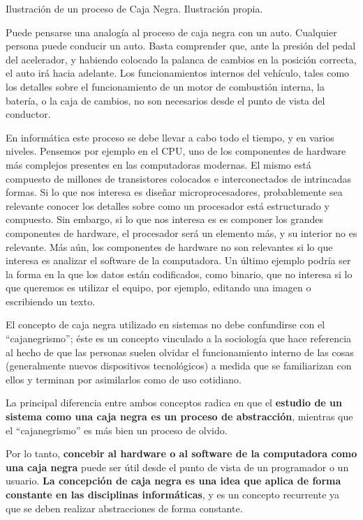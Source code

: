 {Ilustración de un proceso de Caja Negra.}
{Ilustración propia.}

Puede pensarse una analogía al proceso de caja negra con un auto. Cualquier
persona puede conducir un auto. Basta comprender que, ante la presión del
pedal del acelerador, y habiendo colocado la palanca de cambios en la posición
correcta, el auto irá hacia adelante. Los funcionamientos internos del vehículo,
tales como los detalles sobre el funcionamiento de un motor de combustión
interna, la batería, o la caja de cambios, no son necesarios desde el punto de
vista del conductor.

En informática este proceso se debe llevar a cabo todo el tiempo, y en varios niveles.
Pensemos por ejemplo en el CPU, uno de los componentes de hardware más
complejos presentes en las computadoras modernas. El mismo está compuesto
de millones de transistores colocados e interconectados de intrincadas formas.
Si lo que nos interesa es diseñar microprocesadores, probablemente sea relevante
conocer los detalles sobre como un procesador está estructurado y compuesto. Sin
embargo, si lo que nos interesa es es componer los grandes componentes de hardware,
el procesador será un elemento más, y su interior no es relevante. Más aún, los
componentes de hardware no son relevantes si lo que interesa es analizar el
software de la computadora. Un último ejemplo podría ser la forma en la que los
datos están codificados, como binario, que no interesa si lo que queremos es
utilizar el equipo, por ejemplo, editando una imagen o escribiendo un texto.

El concepto de caja negra utilizado en sistemas no debe confundirse con el
``cajanegrismo''; éste es un concepto vinculado a la sociología que hace
referencia al hecho de que las personas suelen olvidar el funcionamiento interno
de las cosas (generalmente nuevos dispositivos tecnológicos) a medida que se
familiarizan con ellos y terminan por asimilarlos como de uso cotidiano.

La principal diferencia entre ambos conceptos radica en que el \textbf{estudio
de un sistema como una caja negra es un proceso de abstracción}, mientras que el
``cajanegrismo'' es más bien un proceso de olvido.

Por lo tanto, \textbf{concebir al hardware o al software de la computadora como
una caja negra} puede ser útil desde el punto de vista de un programador o un usuario.
\textbf{La concepción de caja negra es una idea que aplica de forma constante en
las disciplinas informáticas}, y es un concepto recurrente ya que se deben realizar
abstracciones de forma constante.

